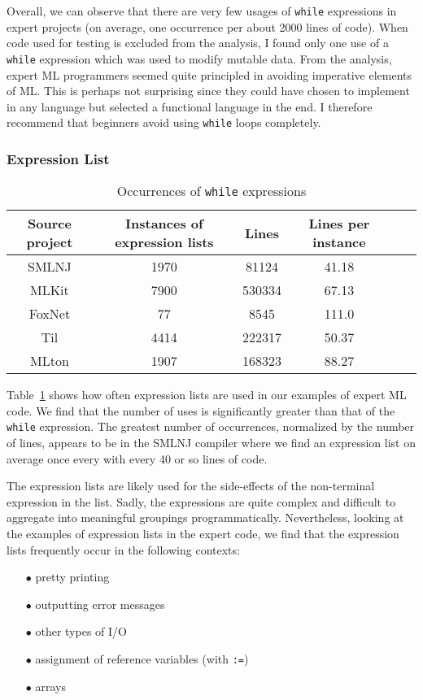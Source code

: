 \documentclass[12pt,abstracton]{scrartcl}
\begin{document}
Overall, we can observe that there are very few usages of \texttt{while} expressions
in expert projects (on average, one occurrence per about 2000 lines of code).
When code used for testing is excluded from the analysis, I found only one use
of a \texttt{while} expression which was used to modify mutable data.
From the analysis, expert ML programmers seemed quite principled in avoiding imperative
elements of ML. This is perhaps not surprising since they could have chosen
to implement in any language but selected a functional language in the end.
I therefore recommend that beginners avoid using \texttt{while} loops completely.
\subsubsection{Expression List}
\begin{table}[h!]
\centering
\begin{tabular}{|c||c|c||c|c|c|}
\hline
Source project & Instances of expression lists & Lines & Lines per instance \\ \hline\hline
SMLNJ & 1970 & 81124 & 41.18 \\ 
MLKit & 7900 & 530334 & 67.13 \\
FoxNet & 77 & 8545 & 111.0 \\
Til & 4414 & 222317 & 50.37 \\
MLton & 1907 & 168323 & 88.27 \\ \hline
\end{tabular}
\caption{Occurrences of \texttt{while} expressions}
\label{table:explist}
\end{table}
Table~\ref{table:explist} shows how often expression lists are used in our
examples of expert ML code. We find that the number of uses is significantly
greater than that of the \texttt{while} expression. The greatest number
of occurrences, normalized by the number of lines, appears to be in the SMLNJ
compiler where we find an expression list on average once every with every
40 or so lines of code.

The expression lists are likely used for the side-effects of the non-terminal
expression in the list. Sadly, the expressions are quite complex and difficult
to aggregate into meaningful groupings programmatically. Nevertheless,
looking at the examples of expression lists in the expert code, we find that
the expression lists frequently occur in the following contexts:
\begin{itemize}
\item[$\bullet$] pretty printing
\item[$\bullet$] outputting error messages
\item[$\bullet$] other types of I/O
\item[$\bullet$] assignment of reference variables (with \texttt{:=})
\item[$\bullet$] arrays
\end{itemize}
\end{document}
